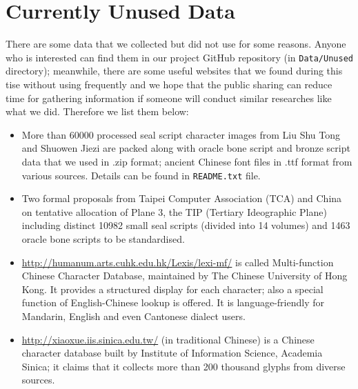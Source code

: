 \chapter{Currently Unused Data}
\label{ch:appendix_1}
There are some data that we collected but did not use for some reasons. Anyone who is interested can find them in our project GitHub repository (in \texttt{Data/Unused} directory); meanwhile, there are some useful websites that we found during this tise without using frequently and we hope that the public sharing can reduce time for gathering information if someone will conduct similar researches like what we did. Therefore we list them below:
\begin{itemize}
	\item More than 60000 processed seal script character images from Liu Shu Tong and Shuowen Jiezi are packed along with oracle bone script and bronze script data that we used in .zip format; ancient Chinese font files in .ttf format from various sources. Details can be found in \texttt{README.txt} file.
	\item Two formal proposals from Taipei Computer Association	(TCA) and China on tentative allocation of Plane 3, the TIP (Tertiary Ideographic Plane) including distinct 10982 small seal scripts (divided into 14 volumes) and 1463 oracle bone scripts to be standardised.
	\item \url{http://humanum.arts.cuhk.edu.hk/Lexis/lexi-mf/} is called Multi-function Chinese Character Database, maintained by The Chinese University of Hong Kong. It provides a structured display for each character; also a special function of English-Chinese lookup is offered. It is language-friendly for Mandarin, English and even Cantonese dialect users.
	\item \url{http://xiaoxue.iis.sinica.edu.tw/} (in traditional Chinese) is a Chinese character database built by Institute of Information Science, Academia Sinica; it claims that it collects more than 200 thousand glyphs from diverse sources.
\end{itemize}
